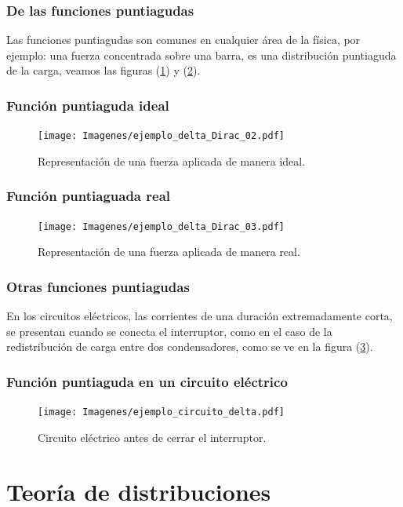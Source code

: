 \documentclass[12pt]{beamer}
\begin{document}
\begin{frame}
\frametitle{De las funciones puntiagudas}
Las funciones puntiagudas son comunes en cualquier área de la física, \pause por ejemplo: una fuerza concentrada sobre una barra, es una distribución puntiaguda de la carga, \pause veamos las figuras (\ref{fig:figura_delta_Dirac_02}) y (\ref{fig:figura_delta_Dirac_03}). 
\end{frame}

\begin{frame}
\frametitle{Función puntiaguda ideal}
\begin{figure}[H]
    \centering
    \texttt{[image: Imagenes/ejemplo\_delta\_Dirac\_02.pdf]}
    \caption{Representación de una fuerza aplicada de manera ideal.}
    \label{fig:figura_delta_Dirac_02}
\end{figure}
\end{frame}

\begin{frame}
\frametitle{Función puntiaguada real}
\begin{figure}[H]
    \centering
    \texttt{[image: Imagenes/ejemplo\_delta\_Dirac\_03.pdf]}
    \caption{Representación de una fuerza aplicada de manera real.}
    \label{fig:figura_delta_Dirac_03}
\end{figure}
\end{frame}

\begin{frame}
\frametitle{Otras funciones puntiagudas}
En los circuitos eléctricos, las corrientes  de una duración extremadamente corta, \pause se presentan cuando se conecta el interruptor, como en el caso de la redistribución de carga entre dos condensadores, como se ve en la figura (\ref{fig_figura_delta_Dirac_04}).
\end{frame}

\begin{frame}
\frametitle{Función puntiaguda en un circuito eléctrico}
\begin{figure}[H]
    \centering
    \texttt{[image: Imagenes/ejemplo\_circuito\_delta.pdf]}
    \caption{Circuito eléctrico antes de cerrar el interruptor.}
    \label{fig_figura_delta_Dirac_04}
\end{figure}
\end{frame}

\section{Teoría de distribuciones}
\end{document}
